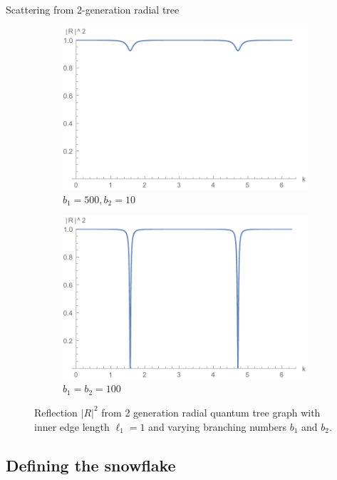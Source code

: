 \documentclass{beamer}
\newcommand{\abs}[1]{\left\lvert#1\right\rvert}
\begin{document}
\begin{frame}{Scattering from 2-generation radial tree}
\begin{figure}[h]
\begin{subfigure}[t]{0.35\textwidth}
        \includegraphics[width=1\textwidth]{../latex/img/2gen_reflection_l=1_b1=500_b2=10}
        \caption{$b_1=500, b_2=10$}
      \end{subfigure}
      \begin{subfigure}[t]{0.35\textwidth}
        \includegraphics[width=1\textwidth]{../latex/img/2gen_reflection_l=1_b1=100_b2=100}
        \caption{$b_1=b_2=100$}
      \end{subfigure}
      \vspace{-0.3em}
      \caption{Reflection $\abs{R}^2$ from 2 generation radial quantum tree graph with inner edge length $\ell_1=1$ and varying branching numbers $b_1$ and $b_2$.}
      \label{fig: 2 gen reflection}
    \end{figure}
  \end{frame}


  \subsection{Defining the snowflake}
\end{document}
